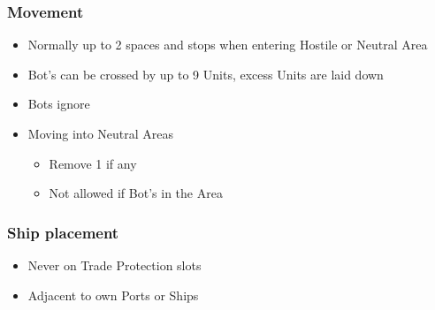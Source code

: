 \documentclass[10pt]{article}
\begin{document}
\subsubsection*{Movement}
\begin{itemize}
	\item Normally up to 2 spaces and stops when entering Hostile or Neutral Area
	\item Bot's  can be crossed by up to 9 Units, excess Units are laid down
	\item Bots ignore 
	\item Moving into Neutral Areas
	\begin{itemize}
		\item Remove 1 \influence if any
		\item Not allowed if Bot's \claim in the Area
	\end{itemize}
\end{itemize}

\subsubsection*{Ship placement}
\begin{itemize}
	\item Never on Trade Protection slots
	\item Adjacent to own Ports or Ships
\end{itemize}
\end{document}
